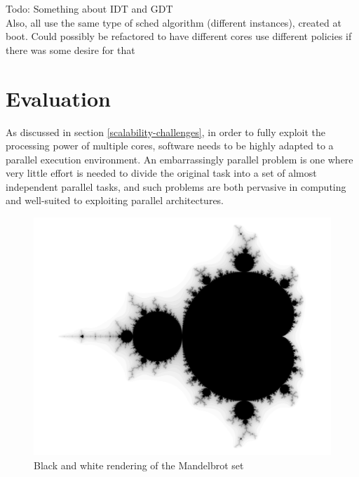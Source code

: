 \documentclass[bsc,frontabs,singlespacing,parskip,deptreport]{infthesis}
\begin{document}
Todo: Something about IDT and GDT \\
Also, all use the same type of  sched algorithm (different instances), created at boot. Could possibly be refactored to have different cores use different policies if there was some desire for that

\chapter{Evaluation}
As discussed in section \ref{scalability-challenges}, in order to fully exploit the processing power of multiple cores, software needs to be highly adapted to a parallel execution environment. An embarrassingly parallel problem is one where very little effort is needed to divide the original task into a set of almost independent parallel tasks, and such problems are both pervasive in computing and well-suited to exploiting parallel architectures. 

\begin{figure}[h]
    \centering
    \includegraphics[scale=0.17]{mandelbrot-bw.jpg}
    \caption{Black and white rendering of the Mandelbrot set \cite{mandelbrot-bw}}
    \label{mandelbrot-bw}
\end{figure}
\end{document}
